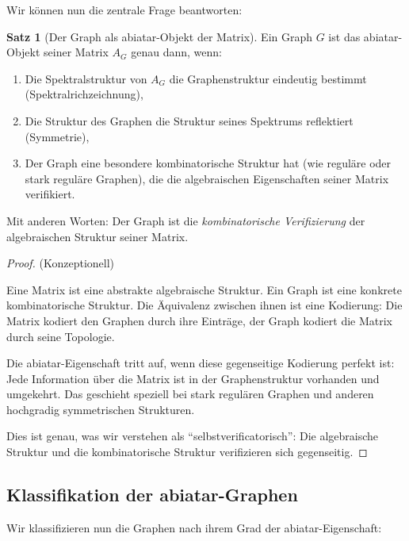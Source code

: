 \documentclass[a4paper,12pt]{article}
\theoremstyle{definition}
\newtheorem{satz}{Satz}
\begin{document}
Wir können nun die zentrale Frage beantworten:

\begin{satz}[Der Graph als abiatar-Objekt der Matrix]
Ein Graph $G$ ist das abiatar-Objekt seiner Matrix $A_G$ genau dann, wenn:

\begin{enumerate}
\item Die Spektralstruktur von $A_G$ die Graphenstruktur eindeutig bestimmt (Spektralrichzeichnung),

\item Die Struktur des Graphen die Struktur seines Spektrums reflektiert (Symmetrie),

\item Der Graph eine besondere kombinatorische Struktur hat (wie reguläre oder stark reguläre Graphen), die die algebraischen Eigenschaften seiner Matrix verifikiert.
\end{enumerate}

Mit anderen Worten: Der Graph ist die \textit{kombinatorische Verifizierung} der algebraischen Struktur seiner Matrix.
\end{satz}

\begin{proof}
(Konzeptionell)

Eine Matrix ist eine abstrakte algebraische Struktur. Ein Graph ist eine konkrete kombinatorische Struktur. Die Äquivalenz zwischen ihnen ist eine Kodierung: Die Matrix kodiert den Graphen durch ihre Einträge, der Graph kodiert die Matrix durch seine Topologie.

Die abiatar-Eigenschaft tritt auf, wenn diese gegenseitige Kodierung perfekt ist: Jede Information über die Matrix ist in der Graphenstruktur vorhanden und umgekehrt. Das geschieht speziell bei stark regulären Graphen und anderen hochgradig symmetrischen Strukturen.

Dies ist genau, was wir verstehen als ``selbstverificatorisch'': Die algebraische Struktur und die kombinatorische Struktur verifizieren sich gegenseitig.
\end{proof}

\subsection{Klassifikation der abiatar-Graphen}

Wir klassifizieren nun die Graphen nach ihrem Grad der abiatar-Eigenschaft:
\end{document}
